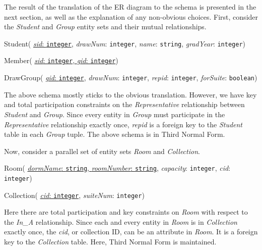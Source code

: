 The result of the translation of the ER diagram to the schema is presented in
the next section, as well as the explanation of any non-obvious choices. First,
consider the \emph{Student} and \emph{Group} entity sets and their mutual
relationships.

\begin{description}
  \item Student(
        \ul{\emph{sid}: \texttt{integer}},
        \emph{drawNum}: \texttt{integer},
        \emph{name}: \texttt{string},
        \emph{gradYear}: \texttt{integer})

  \item Member(
        \ul{\emph{sid}: \texttt{integer},
        \emph{gid}: \texttt{integer}})

  \item DrawGroup(
        \ul{\emph{gid}: \texttt{integer}},
        \emph{drawNum}: \texttt{integer},
        \emph{repid}: \texttt{integer},
        \emph{forSuite}: \texttt{boolean})
\end{description}

The above schema mostly sticks to the obvious translation.  However, we have key
and total participation constraints on the \emph{Representative}
relationship between \emph{Student} and \emph{Group}. Since every entity in
\emph {Group} must participate in the \emph{Representative} relationship exactly
once, \emph{repid} is a foreign key to the \emph{Student} table in each
\emph{Group} tuple. The above schema is in Third Normal Form.

Now, consider a parallel set of entity sets \emph{Room} and \emph{Collection}.

\begin{description}
  \item Room(
        \ul{\emph{dormName}: \texttt{string},
        \emph{roomNumber}: \texttt{string}},
        \emph{capacity}: \texttt{integer},
        \emph{cid}: \texttt{integer})

  \item Collection(
        \ul{\emph{cid}: \texttt{integer}},
        \emph{suiteNum}: \texttt{integer})
\end{description}

Here there are total participation and key constraints on \emph{Room} with
respect to the \emph{In\_A} relationship.  Since each and every entity in
\emph{Room} is in \emph{Collection} exactly once, the \emph{cid}, or collection
ID, can be an attribute in \emph{Room}. It is a foreign key to the
\emph{Collection} table. Here, Third Normal Form is maintained.

